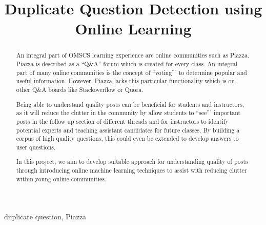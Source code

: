 \documentclass[journal,12pt,onecolumn,draftclsnofoot,]{IEEEtran}
\begin{document}

\title{Duplicate Question Detection using Online Learning}

\author{
}

\maketitle


\begin{abstract}
An integral part of OMSCS learning experience are online communities such as Piazza. Piazza is described as a ``Q\&A'' forum which is created for every class\cite{kincaid}. An integral part of many online communities is the concept of ``voting''' to determine popular and useful information. However, Piazza lacks this particular functionality which is on other Q\&A boards like Stackoverflow or Quora.

Being able to understand quality posts can be beneficial for students and instructors, as it will reduce the clutter in the community by allow students to ``see''' important posts in the follow up section of different threads and for instructors to identify potential experts and teaching assistant candidates for future classes. By building a corpus of high quality questions, this could even be extended to develop answers to user questions.

In this project, we aim to develop suitable approach for understanding quality of posts through introducing online machine learning techniques to assist with reducing clutter within young online communities. 

\end{abstract}

\begin{IEEEkeywords}
duplicate question, Piazza
\end{IEEEkeywords}
\end{document}
